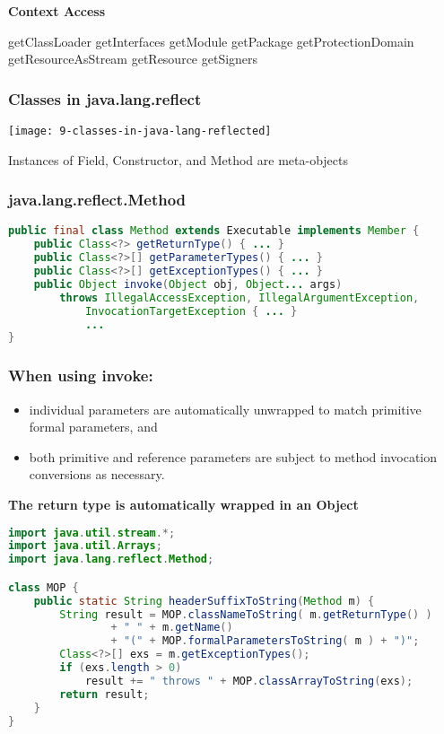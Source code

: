\textbf{Context Access}

getClassLoader
getInterfaces
getModule
getPackage
getProtectionDomain
getResourceAsStream
getResource
getSigners

\subsubsection{Classes in java.lang.reflect}

\begin{center}
\texttt{[image: 9-classes-in-java-lang-reflected]}
\end{center}

Instances of Field, Constructor, and Method are meta-objects

\subsubsection{java.lang.reflect.Method}

\begin{lstlisting}[language=Java]
public final class Method extends Executable implements Member {
	public Class<?> getReturnType() { ... }
	public Class<?>[] getParameterTypes() { ... }
	public Class<?>[] getExceptionTypes() { ... }
	public Object invoke(Object obj, Object... args)
		throws IllegalAccessException, IllegalArgumentException,
			InvocationTargetException { ... }
			...
}
\end{lstlisting}

\subsubsection{When using invoke:}

\begin{itemize}
	\item individual parameters are automatically unwrapped to match primitive formal parameters, and
	\item both primitive and reference parameters are subject to method
invocation conversions as necessary.
\end{itemize}

\textbf{The return type is automatically wrapped in an Object}

\begin{lstlisting}[language=Java]
import java.util.stream.*;
import java.util.Arrays;
import java.lang.reflect.Method;

class MOP {
	public static String headerSuffixToString(Method m) {
		String result = MOP.classNameToString( m.getReturnType() )
				+ " " + m.getName()
				+ "(" + MOP.formalParametersToString( m ) + ")";
		Class<?>[] exs = m.getExceptionTypes();
		if (exs.length > 0)
			result += " throws " + MOP.classArrayToString(exs);
		return result;
	}
}
\end{lstlisting}

